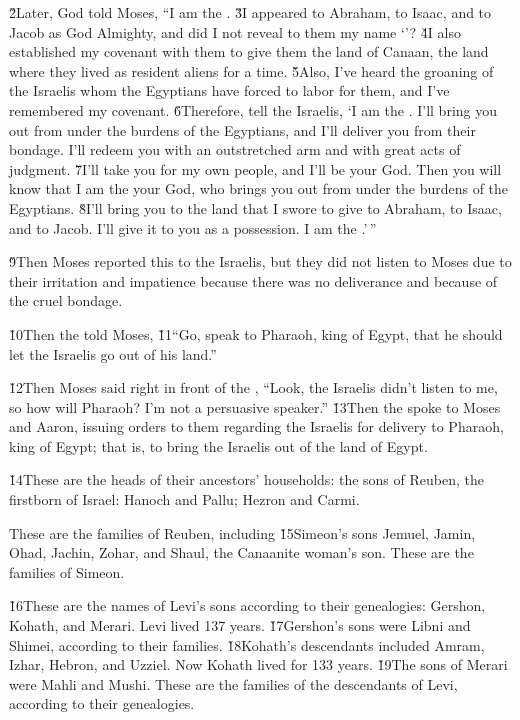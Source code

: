 \v{2}Later, God told Moses, ``I am the . \v{3}I appeared to Abraham, to Isaac, and to Jacob as God Almighty, and did I not reveal to them my name `'? \v{4}I also established my covenant with them to give them the land of Canaan, the land where they lived as resident aliens for a time. \v{5}Also, I've heard the groaning of the Israelis whom the Egyptians have forced to labor for them, and I've remembered my covenant. \v{6}Therefore, tell the Israelis, `I am the . I'll bring you out from under the burdens of the Egyptians, and I'll deliver you from their bondage. I'll redeem you with an outstretched arm and with great acts of judgment. \v{7}I'll take you for my own people, and I'll be your God. Then you will know that I am the  your God, who brings you out from under the burdens of the Egyptians. \v{8}I'll bring you to the land that I swore to give to Abraham, to Isaac, and to Jacob. I'll give it to you as a possession. I am the .'\,''

\v{9}Then Moses reported this to the Israelis, but they did not listen to Moses due to their irritation and impatience because there was no deliverance and because of the cruel bondage.

\v{10}Then the  told Moses, \v{11}``Go, speak to Pharaoh, king of Egypt, that he should let the Israelis go out of his land.''

\v{12}Then Moses said right in front of the , ``Look, the Israelis didn't listen to me, so how will Pharaoh? I'm not a persuasive speaker.'' \v{13}Then the  spoke to Moses and Aaron, issuing orders to them regarding the Israelis for delivery to Pharaoh, king of Egypt; that is, to bring the Israelis out of the land of Egypt.

\v{14}These are the heads of their ancestors' households: the sons of Reuben, the firstborn of Israel: Hanoch and Pallu; Hezron and Carmi.

These are the families of Reuben, including \v{15}Simeon's sons Jemuel, Jamin, Ohad, Jachin, Zohar, and Shaul, the Canaanite woman's son. These are the families of Simeon.

\v{16}These are the names of Levi's sons according to their genealogies: Gershon, Kohath, and Merari. Levi lived 137 years. \v{17}Gershon's sons were Libni and Shimei, according to their families. \v{18}Kohath's descendants included Amram, Izhar, Hebron, and Uzziel. Now Kohath lived for 133 years. \v{19}The sons of Merari were Mahli and Mushi. These are the families of the descendants of Levi, according to their genealogies.

